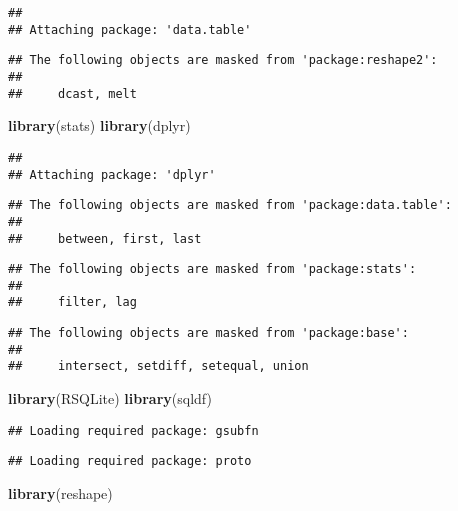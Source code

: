\documentclass[]{article}
\newenvironment{Shaded}{\begin{snugshade}}{\end{snugshade}}
\newcommand{\KeywordTok}[1]{\textcolor[rgb]{0.13,0.29,0.53}{\textbf{#1}}}
\newcommand{\NormalTok}[1]{#1}
\begin{document}
\begin{verbatim}
## 
## Attaching package: 'data.table'
\end{verbatim}

\begin{verbatim}
## The following objects are masked from 'package:reshape2':
## 
##     dcast, melt
\end{verbatim}

\begin{Shaded}
\begin{Highlighting}[]
\KeywordTok{library}\NormalTok{(stats)}
\KeywordTok{library}\NormalTok{(dplyr)}
\end{Highlighting}
\end{Shaded}

\begin{verbatim}
## 
## Attaching package: 'dplyr'
\end{verbatim}

\begin{verbatim}
## The following objects are masked from 'package:data.table':
## 
##     between, first, last
\end{verbatim}

\begin{verbatim}
## The following objects are masked from 'package:stats':
## 
##     filter, lag
\end{verbatim}

\begin{verbatim}
## The following objects are masked from 'package:base':
## 
##     intersect, setdiff, setequal, union
\end{verbatim}

\begin{Shaded}
\begin{Highlighting}[]
\KeywordTok{library}\NormalTok{(RSQLite)}
\KeywordTok{library}\NormalTok{(sqldf)}
\end{Highlighting}
\end{Shaded}

\begin{verbatim}
## Loading required package: gsubfn
\end{verbatim}

\begin{verbatim}
## Loading required package: proto
\end{verbatim}

\begin{Shaded}
\begin{Highlighting}[]
\KeywordTok{library}\NormalTok{(reshape) }
\end{Highlighting}
\end{Shaded}
\end{document}
